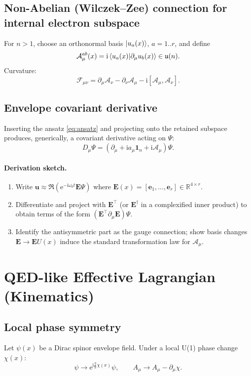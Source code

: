 \documentclass[11pt,a4paper]{article}
\newcommand{\R}{\mathbb{R}}
\providecommand{\ii}{\mathrm{i}}
\providecommand{\e}{\mathrm{e}}
\newcommand{\uvec}{\mathbf{u}}              %
\newcommand{\bbA}{\mathcal{A}}              %
\newcommand{\bbF}{\mathcal{F}}              %
\newcommand{\covD}{D}                       %
\begin{document}
\subsection{Non-Abelian (Wilczek--Zee) connection for internal electron subspace}
For \(n>1\), choose an orthonormal basis \(\ket{u_a(x)}\), \(a=1..r\), and define
\[
\bbA_\mu^{ab}(x) = \ii \braket{u_a(x)}{\partial_\mu u_b(x)}\in\mathfrak{u}(n).
\]
Curvature:
\[
\bbF_{\mu\nu} = \partial_\mu \bbA_\nu - \partial_\nu \bbA_\mu - \ii[\bbA_\mu,\bbA_\nu].
\]

\subsection{Envelope covariant derivative}
Inserting the ansatz \eqref{eq:ansatz} and projecting onto the retained subspace produces,
generically, a covariant derivative acting on \(\Psi\):
\begin{equation}
\covD_\mu \Psi
=
\left(\partial_\mu + \ii a_\mu \mathbf{1}_n + \ii\bbA_\mu\right)\Psi.
\label{eq:covD}
\end{equation}

\paragraph{Derivation sketch.}
\begin{enumerate}
  \item Write \(\uvec \approx \Re(\e^{-\ii\omega_0 t} \mathbf{E}\Psi)\) where
        \(\mathbf{E}(x)=[\mathbf{e}_1,\dots,\mathbf{e}_r]\in\R^{4\times r}\).
  \item Differentiate and project with \(\mathbf{E}^\top\) (or \(\mathbf{E}^\dagger\) in a complexified
        inner product) to obtain terms of the form \((\mathbf{E}^\top \partial_\mu \mathbf{E})\Psi\).
  \item Identify the antisymmetric part as the gauge connection; show basis changes
        \(\mathbf{E}\to \mathbf{E}U(x)\) induce the standard transformation law for \(\bbA_\mu\).
\end{enumerate}

\section{QED-like Effective Lagrangian (Kinematics)}
\label{sec:qed_like}

\subsection{Local phase symmetry}
Let \(\psi(x)\) be a Dirac spinor envelope field. Under a local U(1) phase change
\(\chi(x)\):
\[
\psi \to \e^{\ii \frac{q}{\hbar}\chi(x)}\psi,
\qquad
A_\mu \to A_\mu - \partial_\mu \chi.
\]
\end{document}
